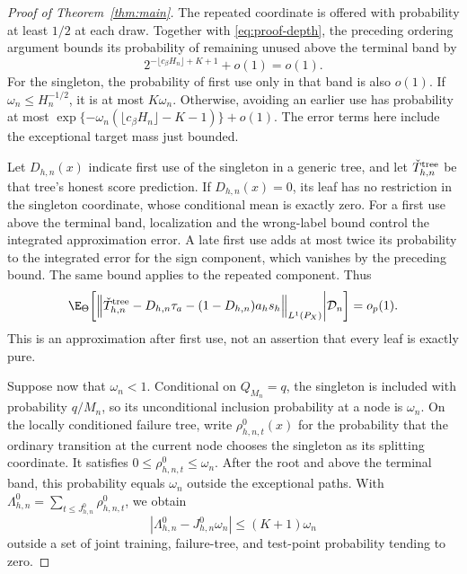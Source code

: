 \begin{appendix}
\begin{proof}[Proof of Theorem~\ref{thm:main}]
The repeated coordinate is offered with probability at least \(1/2\) at
each draw. Together with \eqref{eq:proof-depth}, the preceding ordering
argument bounds its probability of remaining unused above the terminal
band by
\[
2^{-\lfloor c_\beta H_n\rfloor+K+1}+o(1)=o(1).
\]
For the singleton, the probability of first use only in that band is also
\(o(1)\). If \(\omega_n\le H_n^{-1/2}\), it is at most \(K\omega_n\).
Otherwise, avoiding an earlier use has probability at most
\(\exp\{-\omega_n(\lfloor c_\beta H_n\rfloor-K-1)\}+o(1)\).
The error terms here include the exceptional target mass just bounded.

Let \(D_{h,n}(x)\) indicate first use of the singleton in a generic tree,
and let \(\check T^{\rm tree}_{h,n}\) be that tree's honest score prediction.
If \(D_{h,n}(x)=0\), its leaf has no restriction in the singleton coordinate,
whose conditional mean is exactly zero. For a first use above the terminal
band, localization and the wrong-label bound control the integrated
approximation error. A late first use adds at most twice its probability to
the integrated error for the sign component, which vanishes by the preceding
bound.
The same bound applies to the repeated component. Thus
\begin{equation}\label{eq:proof-mixture}
\E_\Theta\!\left[
\left\|\check T^{\rm tree}_{h,n}
-D_{h,n}\tau_a-(1-D_{h,n})a_hs_h\right\|_{L^1(P_X)}
\middle|\mathcal D_n\right]=o_p(1).
\end{equation}
This is an approximation after first use, not an assertion that every leaf
is exactly pure.

Suppose now that \(\omega_n<1\). Conditional on \(Q_{M_n}=q\), the singleton
is included with probability \(q/M_n\), so its unconditional inclusion
probability at a node is \(\omega_n\). On the locally conditioned failure
tree, write \(\rho_{h,n,t}^0(x)\) for the probability that the ordinary
transition at the current node chooses the singleton as its splitting
coordinate. It satisfies \(0\le\rho_{h,n,t}^0\le\omega_n\).
After the root and above the terminal band, this probability equals
\(\omega_n\) outside the exceptional paths. With
\(\Lambda_{h,n}^0=\sum_{t\le J_{h,n}^0}\rho_{h,n,t}^0\), we obtain
\begin{equation}\label{eq:proof-hazard}
\left|\Lambda_{h,n}^0-J_{h,n}^0\omega_n\right|
\le(K+1)\omega_n
\end{equation}
outside a set of joint training, failure-tree, and test-point probability
tending to zero.


\end{proof}
\end{appendix}
